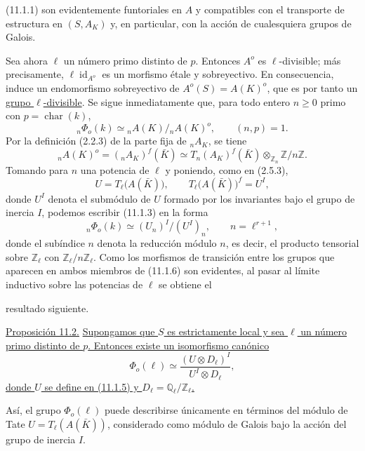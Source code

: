 
(11.1.1) son evidentemente funtoriales en $A$ y compatibles con el
transporte de estructura en $(S,A_K)$ y, en particular, con la acción
de cualesquiera grupos de Galois.

Sea ahora $\ell$ un número primo distinto de $p$. Entonces $A^o$ es
$\ell$-divisible; más precisamente, $\ell\operatorname{id}_{A^o}$ es
un morfismo étale y sobreyectivo. En consecuencia, induce un
endomorfismo sobreyectivo de $A^o(S)=A(K)^o$, que es por tanto un
\underline{grupo $\ell$-divisible}. Se sigue inmediatamente que, para
todo entero $n\geq0$ primo con $p=\operatorname{char}(k)$,
\begin{equation}\tag{11.1.3}
{}_n\Phi_o(k)\simeq{}_nA(K)/{}_nA(K)^o,
 \qquad (n,p)=1.
\end{equation}
Por la definición (2.2.3) de la parte fija de ${}_nA_K$, se tiene
\begin{equation}\tag{11.1.4}
{}_nA(K)^o=({}_nA_K)^f(\bar K)
 \simeq T_n(A_K)^f(\bar K)
 \otimes_{\mathbb Z_n}\mathbb Z/n\mathbb Z.
\end{equation}
Tomando para $n$ una potencia de $\ell$ y poniendo, como en (2.5.3),
\begin{equation}\tag{11.1.5}
U=T_\ell\bigl(A(\bar K)\bigr),
 \qquad
T_\ell\bigl(A(\bar K)\bigr)^f=U^I,
\end{equation}
donde $U^I$ denota el submódulo de $U$ formado por los invariantes bajo
el grupo de inercia $I$, podemos escribir (11.1.3) en la forma
\begin{equation}\tag{11.1.6}
{}_n\Phi_o(k)\simeq (U_n)^I/(U^I)_n,
 \qquad n=\ell^{r+1},
\end{equation}
donde el subíndice $n$ denota la reducción módulo $n$, es decir, el
producto tensorial sobre $\mathbb Z_\ell$ con
$\mathbb Z_\ell/n\mathbb Z_\ell$. Como los morfismos de transición
entre los grupos que aparecen en ambos miembros de (11.1.6) son
evidentes, al pasar al límite inductivo sobre las potencias de $\ell$
se obtiene el


resultado siguiente.

\medskip
\noindent
\underline{Proposición 11.2.} \underline{Supongamos que $S$ es
estrictamente local y sea $\ell$ un número primo distinto de $p$.
Entonces existe un isomorfismo canónico}
\begin{equation}\tag{11.2.1}
\Phi_o(\ell)\simeq
 \frac{(U\otimes D_\ell)^I}{U^I\otimes D_\ell},
\end{equation}
\underline{donde $U$ se define en (11.1.5) y
$D_\ell=\mathbb Q_\ell/\mathbb Z_\ell$.}

Así, el grupo $\Phi_o(\ell)$ puede describirse únicamente en términos
del módulo de Tate $U=T_\ell(A(\bar K))$, considerado como módulo de
Galois bajo la acción del grupo de inercia $I$.
